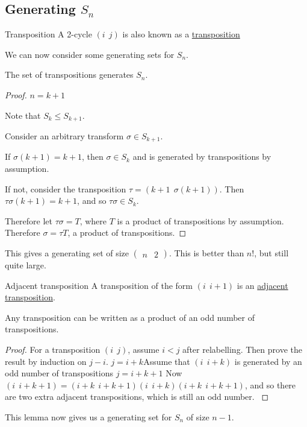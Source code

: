\documentclass[../Main.tex]{subfiles}
\begin{document}
\subsection{Generating \texorpdfstring{$S_n$}{Sn}}
\begin{definition}{Transposition}
    A 2-cycle $(i~~j)$ is also known as a \underline{transposition}
\end{definition}
We can now consider some generating sets for $S_n$.
\begin{theorem}
    The set of transpositions generates $S_n$.
    \label{thmTranspositionsGenerateSn}
\end{theorem}
\begin{proof}
    {$n = k + 1$}{
        Note that $S_k \leq S_{k + 1}$.\par
        Consider an arbitrary transform $\sigma \in S_{k+1}$.\par
        If $\sigma(k+1) = k+1$, then $\sigma \in S_k$ and is generated by transpositions by assumption.\par
        If not, consider the transposition $\tau = (k+1~~\sigma(k+1))$. Then $\tau \sigma(k+1) = k+1$, and so $\tau \sigma \in S_k$.\par
        Therefore let $\tau \sigma = T$, where $T$ is a product of transpositions by assumption. Therefore $\sigma = \tau T$, a product of transpositions.
    }
\end{proof}
\begin{remark}
    This gives a generating set of size $\begin{pmatrix}n & 2\end{pmatrix}$. This is better than $n!$, but still quite large.
\end{remark}
\begin{definition}{Adjacent transposition}
    A transposition of the form $(i~~i+1)$ is an \underline{adjacent transposition}.
\end{definition}
\begin{lemma}
    Any transposition can be written as a product of an odd number of transpositions.
    \label{lemAdjacentTranspositions}
\end{lemma}
\begin{proof}
    For a transposition $(i~~j)$, assume $i < j$ after relabelling. Then prove the result by induction on $j - i$.
    {$j = i + k$}{Assume that $(i~~i+k)$ is generated by an odd number of transpositions}
    {$j = i + k + 1$}{
        Now $(i~~i+k+1) = (i+k~~i+k+1)(i~~i+k)(i+k~~i+k+1)$, and so there are two extra adjacent transpositions, which is still an odd number.
    }
\end{proof}
\begin{remark}
    This lemma now gives us a generating set for $S_n$ of size $n - 1$.
\end{remark}
\end{document}
